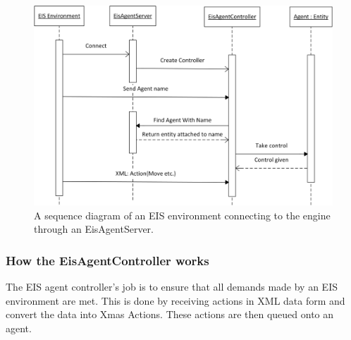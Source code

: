 \begin{figure}
\begin{centering}
\includegraphics[width=1\textwidth]{EISServerSequenceDiagram}
\par\end{centering}

\caption{A sequence diagram of an EIS environment connecting to the engine
through an EisAgentServer.\label{fig:EISServerSequenceDiagram}}


\end{figure}



\subsubsection*{How the EisAgentController works}

The EIS agent controller's job is to ensure that all demands made
by an EIS environment are met. This is done by receiving actions in
XML data form and convert the data into Xmas Actions. These actions
are then queued onto an agent.

